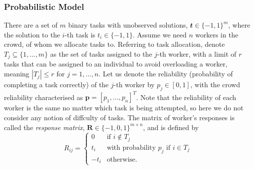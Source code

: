 \documentclass[12pt]{article}
\numberwithin{equation}{section}
\begin{document}
\subsubsection{Probabilistic Model}
\label{sec:background;subsec:crowdsourcingSystems;subsubsec:probabilisticModel}

There are a set of $m$ binary tasks with unobserved solutions, $\mathbfit{t} \in \{-1,1\}^{m}$, where the solution to the $i$-th task is $t_{i} \in \{-1,1\}$. Assume we need $n$ workers in the crowd, of whom we allocate tasks to. Referring to task allocation, denote $T_{j} \subseteq \{1,\dots,m\}$ as the set of tasks assigned to the $j$-th worker, with a limit of $r$ tasks that can be assigned to an individual to avoid overloading a worker, meaning $\left\vert{T_{j}}\right\vert \le r \text{ for } j=1,\dots,n$. Let us denote the reliability (probability of completing a task correctly) of the $j$-th worker by $p_{j} \in [0,1]$, with the crowd reliability characterised as $\mathbf{p} = [p_{1},\dots,p_{n}]^{T}$. Note that the reliability of each worker is the same no matter which task is being attempted, so here we do not consider any notion of diffculty of tasks. The matrix of worker's responses is called the \textsl{response matrix}, $\mathbf{R} \in \{-1,0,1\}^{m \times n}$, and is defined by
\begin{equation*}
	R_{ij} =
	\begin{cases}
		0 & \text{if } i \not \in T_{j}\\
		t_{i} & \text{with probability }  p_{j} \text{ if } i \in T_{j}\\
		-t_{i} & \text{otherwise}.
	\end{cases}
\end{equation*}
\end{document}
